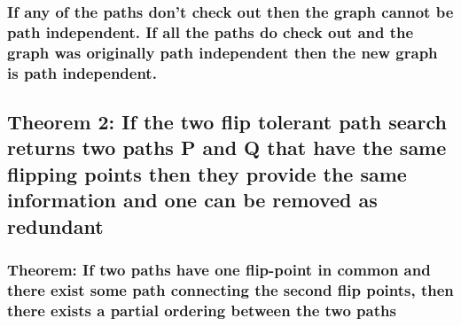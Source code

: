 \documentclass{article}
\begin{document}
\subsubsection{If any of the paths don't check out then the graph cannot be path independent. If all the paths do check out and the graph was originally path independent then the new graph is path independent.}

\subsection{Theorem 2: If the two flip tolerant path search returns two paths P and Q that have the same flipping points then they provide the same information and one can be removed as redundant}

\subsubsection{Theorem: If two paths have one flip-point in common and there exist some path connecting the second flip points, then there exists a partial ordering between the two paths}
\end{document}
